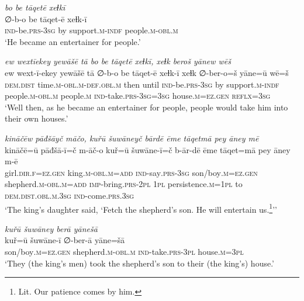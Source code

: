 \ea \label{KŠ.37}
\textit{bo be tāqetē xeɫkī} \\ 
\gll ∅-b-o be tāqet-ē xeɫk-ī \\ 
 \textsc{ind-}be\textsc{.prs}\textsc{-3sg} by support\textsc{.m}\textsc{-indf} people\textsc{.m}\textsc{-obl}\textsc{.m} \\ 
\glt `He became an entertainer for people.'
\z 
 
\ea \label{KŠ.38}
\textit{ew wextīekey yewāšē tā bo be tāqetē xeɫkī, xeɫk beroš yānew wēš} \\ 
\gll ew wext-ī-ekey yewāšē tā ∅-b-o be tāqet-ē xeɫk-ī xeɫk ∅-ber-o=š yāne=ū wē=š \\ 
 \textsc{dem.dist} time\textsc{.m}\textsc{-obl}\textsc{.m}\textsc{-def}\textsc{.obl}\textsc{.m} then until \textsc{ind-}be\textsc{.prs}\textsc{-3sg} by support\textsc{.m}\textsc{-indf} people\textsc{.m}\textsc{-obl}\textsc{.m} people\textsc{.m} \textsc{ind-}take\textsc{.prs}\textsc{-3sg}\textsc{=3sg} house\textsc{.m}\textsc{=ez.gen} \textsc{reflx}\textsc{=3sg} \\ 
\glt `Well then, as he became an entertainer for people, people would take him into their own houses.'
\z 
 
\ea \label{KŠ.40}
\textit{kināčēw pāđšāyč māčo, kuřū šuwāneyč bārdē ēme tāqetmā pey āney mē} \\ 
\gll kināčē=ū pāđšā-ī=č m-āč-o kuř=ū šuwāne-ī=č b-ār-dē ēme tāqet=mā pey āney m-ē \\ 
 girl\textsc{.dir}\textsc{.f}\textsc{=ez.gen} king\textsc{.m}\textsc{-obl}\textsc{.m}\textsc{=add} \textsc{ind-}say\textsc{.prs}\textsc{-3sg} son/boy\textsc{.m}\textsc{=ez.gen} shepherd\textsc{.m}\textsc{-obl}\textsc{.m}\textsc{=add} \textsc{imp-}bring\textsc{.prs}-\textsc{2pl} \textsc{1pl} persistence\textsc{.m}\textsc{=\textsc{1pl}} to \textsc{dem.dist}\textsc{.obl}\textsc{.m}\textsc{.3sg} \textsc{ind-}come\textsc{.prs}\textsc{.3sg} \\ 
\glt `The king’s daughter said, ‘Fetch the shepherd’s son. He will entertain us.\footnote{Lit. Our patience comes by him.}’'
\z 
 
\ea \label{KŠ.41}
\textit{kuřū šuwāney berā yānešā} \\ 
\gll kuř=ū šuwāne-ī ∅-ber-ā yāne=šā \\ 
 son/boy\textsc{.m}\textsc{=ez.gen} shepherd\textsc{.m}\textsc{-obl}\textsc{.m} \textsc{ind-}take\textsc{.prs}\textsc{-3pl} house\textsc{.m}\textsc{=3pl} \\ 
\glt `They (the king’s men) took the shepherd’s son to their (the king’s) house.'
\z 
 
